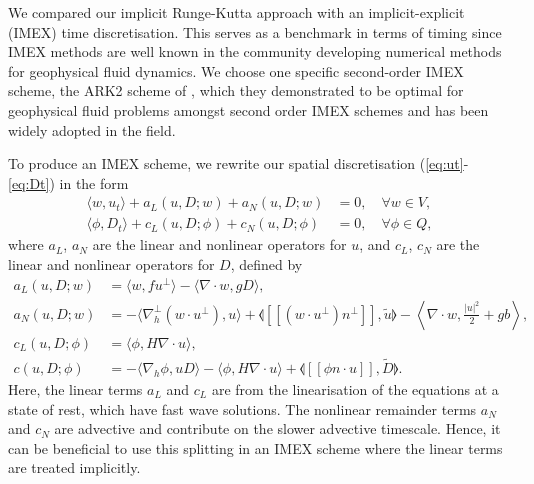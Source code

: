 \documentclass[a4paper, 12pt]{article}
\newcommand{\jump}[1]{[\![#1]\!]}
\begin{document}
We compared our implicit Runge-Kutta approach with an
implicit-explicit (IMEX) time discretisation. This serves as a
benchmark in terms of timing since IMEX methods are well known in the
community developing numerical methods for geophysical fluid dynamics.
We choose one specific second-order IMEX scheme, the ARK2 scheme
of \citet{giraldo2013implicit}, which they demonstrated to be optimal
for geophysical fluid problems amongst second order IMEX schemes and has
been widely adopted in the field.

To produce an IMEX scheme, we rewrite our spatial discretisation
(\ref{eq:ut}-\ref{eq:Dt}) in the form
\begin{align}
  \label{eq:ut IMEX}
  \langle w, u_t \rangle + a_L(u,D;w) 
  + a_N(u,D;w) 
   & = 0,
  \quad \forall w \in V, \\
  \label{eq:Dt IMEX}
  \langle \phi, D_t \rangle
+ c_L(u,D; \phi) + c_N(u,D; \phi)  & =
 0, \quad \forall \phi \in Q,
\end{align}
where $a_L$, $a_N$ are the linear and nonlinear operators for $u$,
and $c_L$, $c_N$ are the linear and nonlinear operators for $D$,
defined by
\begin{align}
  a_L(u,D;w) & = \langle w, fu^\perp \rangle - \langle \nabla\cdot w,
  gD \rangle, \\
   a_N(u,D;w) 
&=
  - \langle \nabla_h^\perp (w\cdot u^\perp), u \rangle
  + \llangle \jump{(w\cdot u^\perp) n^\perp}, \tilde{u} \rrangle  - \left\langle \nabla\cdot w, \frac{|u|^2}{2} + gb \right\rangle, \\
  c_L(u,D;\phi) & = \langle \phi, H\nabla\cdot u\rangle, \\
  c(u,D; \phi) &=
  - \langle \nabla_h \phi, uD \rangle
  - \langle \phi, H\nabla\cdot u\rangle
  + \llangle \jump{\phi n\cdot u}, \tilde{D} \rrangle.
\end{align}
Here, the linear terms $a_L$ and $c_L$ are from the linearisation of
the equations at a state of rest, which have fast wave solutions.
The nonlinear remainder terms $a_N$ and $c_N$ are advective and contribute
on the slower advective timescale. Hence, it can be beneficial to use this
splitting in an IMEX scheme where the linear terms are treated implicitly.
\end{document}

